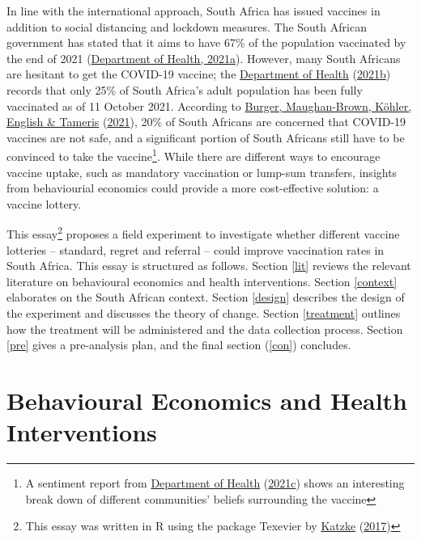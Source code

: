 \documentclass[11pt,preprint, authoryear]{elsarticle}
\numberwithin{equation}{section}
\numberwithin{figure}{section}
\numberwithin{table}{section}
\let\rmarkdownfootnote\footnote%
\def\footnote{\protect\rmarkdownfootnote}
\begin{document}
In line with the international approach, South Africa has issued
vaccines in addition to social distancing and lockdown measures. The
South African government has stated that it aims to have 67\% of the
population vaccinated by the end of 2021
(\protect\hyperlink{ref-herd}{Department of Health, 2021a}). However,
many South Africans are hesitant to get the COVID-19 vaccine; the
\protect\hyperlink{ref-stat}{Department of Health}
(\protect\hyperlink{ref-stat}{2021b}) records that only 25\% of South
Africa's adult population has been fully vaccinated as of 11 October
2021. According to \protect\hyperlink{ref-cram}{Burger, Maughan-Brown,
Köhler, English \& Tameris} (\protect\hyperlink{ref-cram}{2021}), 20\%
of South Africans are concerned that COVID-19 vaccines are not safe, and
a significant portion of South Africans still have to be convinced to
take the vaccine\footnote{A sentiment report from
  \protect\hyperlink{ref-report}{Department of Health}
  (\protect\hyperlink{ref-report}{2021c}) shows an interesting break
  down of different communities' beliefs surrounding the vaccine}. While
there are different ways to encourage vaccine uptake, such as mandatory
vaccination or lump-sum transfers, insights from behaviourial economics
could provide a more cost-effective solution: a vaccine lottery.

This essay\footnote{This essay was written in R using the package
  Texevier by \protect\hyperlink{ref-Texevier}{Katzke}
  (\protect\hyperlink{ref-Texevier}{2017})} proposes a field experiment
to investigate whether different vaccine lotteries -- standard, regret
and referral -- could improve vaccination rates in South Africa. This
essay is structured as follows. Section \ref{lit} reviews the relevant
literature on behavioural economics and health interventions. Section
\ref{context} elaborates on the South African context. Section
\ref{design} describes the design of the experiment and discusses the
theory of change. Section \ref{treatment} outlines how the treatment
will be administered and the data collection process. Section \ref{pre}
gives a pre-analysis plan, and the final section (\ref{con}) concludes.

\hypertarget{behavioural-economics-and-health-interventions}{%
\section{\texorpdfstring{Behavioural Economics and Health Interventions
\label{lit}}{Behavioural Economics and Health Interventions }}\label{behavioural-economics-and-health-interventions}}
\end{document}
